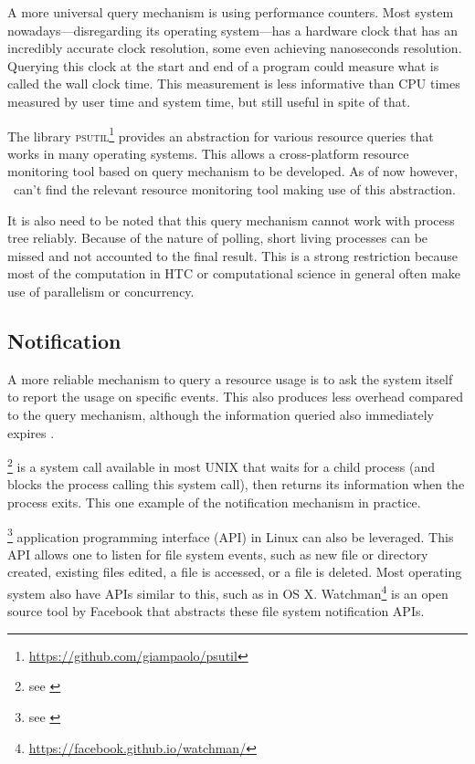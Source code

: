 A more universal query mechanism is using performance counters.
Most system nowadays---disregarding its operating system---has a hardware clock that has an incredibly accurate clock resolution, some even achieving nanoseconds resolution.
Querying this clock at the start and end of a program could measure what is called the wall clock time.
This measurement is less informative than CPU times measured by user time and system time, but still useful in spite of that.

The library \textsc{psutil}\footnote{\href{https://github.com/giampaolo/psutil}{https://github.com/giampaolo/psutil}} provides an abstraction for various resource queries that works in many operating systems.
This allows a cross-platform resource monitoring tool based on query mechanism to be developed.
As of now however, \first~can't find the relevant resource monitoring tool making use of this abstraction.

It is also need to be noted that this query mechanism cannot work with process tree reliably.
Because of the nature of polling, short living processes can be missed and not accounted to the final result.
This is a strong restriction because most of the computation in HTC or computational science in general often make use of parallelism or concurrency.


\subsection{Notification}

A more reliable mechanism to query a resource usage is to ask the system itself to report the usage on specific events.
This also produces less overhead compared to the query mechanism, although the information queried also immediately expires \citep{juvePracticalResourceMonitoring2015}.

\footnote{see \href{https://linux.die.net/man/2/wait4}{}} is a system call available in most UNIX that waits for a child process (and blocks the process calling this system call), then returns its  information when the process exits.
This one example of the notification mechanism in practice.

\footnote{see \href{https://linux.die.net/man/7/inotify}{}} application programming interface (API) in Linux can also be leveraged.
This API allows one to listen for file system events, such as new file or directory created, existing files edited, a file is accessed, or a file is deleted.
Most operating system also have APIs similar to this, such as  in OS X. Watchman\footnote{\href{https://facebook.github.io/watchman/}{https://facebook.github.io/watchman/}} is an open source tool by Facebook that abstracts these file system notification APIs.

